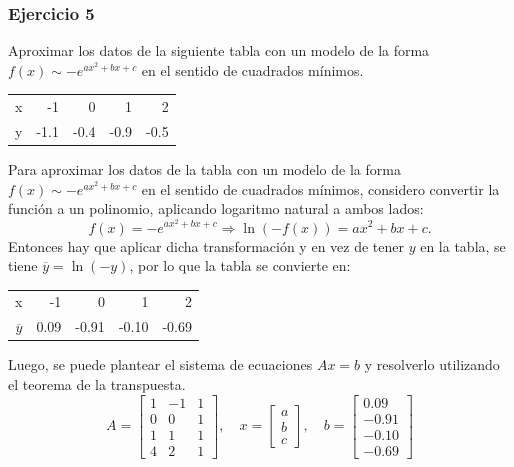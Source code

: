 \documentclass{article}
\begin{document}
\subsubsection{Ejercicio 5}
Aproximar los datos de la siguiente tabla con un modelo de la forma $f(x) \sim -e^{ax^2+bx+c}$ en el sentido de cuadrados mínimos.
\begin{center}
\begin{tabular}{||r||r|r|r|r||}
\hline
x & -1 & 0 & 1 & 2\\
y & -1.1 & -0.4 & -0.9 & -0.5\\
\hline
\end{tabular}
\end{center}
Para aproximar los datos de la tabla con un modelo de la forma \( f(x) \sim -e^{ax^2+bx+c} \) en el sentido de cuadrados mínimos, considero convertir la función a un polinomio, aplicando logaritmo natural a ambos lados:
\[
f(x) = -e^{ax^2+bx+c} \Rightarrow \ln(-f(x)) = ax^2 + bx + c.
\]
Entonces hay que aplicar dicha transformación y en vez de tener \( y \) en la tabla, se tiene \( \overline{y} = \ln(-y) \), por lo que la tabla se convierte en:
\begin{center}
\begin{tabular}{||r||r|r|r|r||}
\hline
x & -1 & 0 & 1 & 2\\
$\overline{y}$ & 0.09 & -0.91 & -0.10 & -0.69\\
\hline
\end{tabular}
\end{center}
Luego, se puede plantear el sistema de ecuaciones \( Ax = b \) y resolverlo utilizando el teorema de la transpuesta.
\begin{equation}
    A = \begin{bmatrix}
        1 & -1 & 1 \\
        0 & 0 & 1 \\
        1 & 1 & 1 \\
        4 & 2 & 1
    \end{bmatrix}, \quad x = \begin{bmatrix}
        a \\
        b \\
        c
    \end{bmatrix}, \quad b = \begin{bmatrix}
        0.09 \\
        -0.91 \\
        -0.10 \\
        -0.69
    \end{bmatrix}
\end{equation}
\end{document}

